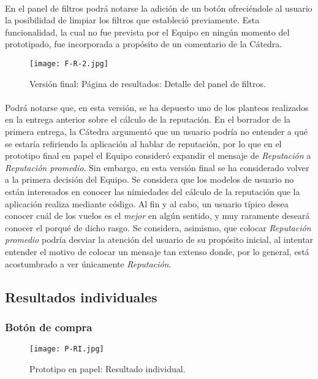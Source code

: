 \documentclass[spanish]{article}
\begin{document}
	\paragraph{} En el panel de filtros podrá notarse la adición de un botón ofreciéndole al usuario la posibilidad de limpiar los filtros que estableció previamente. Esta funcionalidad, la cual no fue prevista por el Equipo en ningún momento del prototipado, fue incorporada a propósito de un comentario de la Cátedra.
			\begin{figure}[h]
				\centering
				\texttt{[image: F-R-2.jpg]}
				\caption{Versión final: Página de resultados: Detalle del panel de filtros.}
			\end{figure}
	\paragraph{} Podrá notarse que, en esta versión, se ha depuesto uno de los planteos realizados en la entrega anterior sobre el cálculo de la reputación. En el borrador de la primera entrega, la Cátedra argumentó que un usuario podría no entender a qué se estaría refiriendo la aplicación al hablar de reputación, por lo que en el prototipo final en papel el Equipo consideró expandir el mensaje de \textit{Reputación} a \textit{Reputación promedio}. Sin embargo, en esta versión final se ha considerado volver a la primera decisión del Equipo. Se considera que los modelos de usuario no están interesados en conocer las nimiedades del cálculo de la reputación que la aplicación realiza mediante código. Al fin y al cabo, un usuario típico desea conocer cuál de los vuelos es el \textit{mejor} en algún sentido, y muy raramente deseará conocer el porqué de dicho rasgo. Se considera, asimismo, que colocar \textit{Reputación promedio} podría desviar la atención del usuario de su propósito inicial, al intentar entender el motivo de colocar un mensaje tan extenso donde, por lo general, está acostumbrado a ver únicamente \textit{Reputación}.
	\subsection{Resultados individuales}
	\subsubsection{Botón de compra}
			\begin{figure}[h]
				\centering
				\texttt{[image: P-RI.jpg]}
				\caption{Prototipo en papel: Resultado individual.}
			\end{figure}
\end{document}
